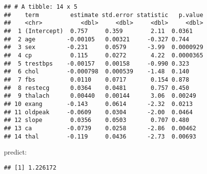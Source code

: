 \documentclass[
]{article}
\newenvironment{Shaded}{\begin{snugshade}}{\end{snugshade}}
\newcommand{\AttributeTok}[1]{\textcolor[rgb]{0.77,0.63,0.00}{#1}}
\newcommand{\DecValTok}[1]{\textcolor[rgb]{0.00,0.00,0.81}{#1}}
\newcommand{\FloatTok}[1]{\textcolor[rgb]{0.00,0.00,0.81}{#1}}
\newcommand{\FunctionTok}[1]{\textcolor[rgb]{0.00,0.00,0.00}{#1}}
\newcommand{\NormalTok}[1]{#1}
\newcommand{\OtherTok}[1]{\textcolor[rgb]{0.56,0.35,0.01}{#1}}
\newcommand{\SpecialCharTok}[1]{\textcolor[rgb]{0.00,0.00,0.00}{#1}}
\newcommand{\StringTok}[1]{\textcolor[rgb]{0.31,0.60,0.02}{#1}}
\begin{document}
\begin{verbatim}
## # A tibble: 14 x 5
##    term         estimate std.error statistic   p.value
##    <chr>           <dbl>     <dbl>     <dbl>     <dbl>
##  1 (Intercept)  0.757     0.359        2.11  0.0361   
##  2 age         -0.00105   0.00321     -0.327 0.744    
##  3 sex         -0.231     0.0579      -3.99  0.0000929
##  4 cp           0.115     0.0272       4.22  0.0000365
##  5 trestbps    -0.00157   0.00158     -0.990 0.323    
##  6 chol        -0.000798  0.000539    -1.48  0.140    
##  7 fbs          0.0110    0.0717       0.154 0.878    
##  8 restecg      0.0364    0.0481       0.757 0.450    
##  9 thalach      0.00440   0.00144      3.06  0.00249  
## 10 exang       -0.143     0.0614      -2.32  0.0213   
## 11 oldpeak     -0.0609    0.0304      -2.00  0.0464   
## 12 slope        0.0356    0.0503       0.707 0.480    
## 13 ca          -0.0739    0.0258      -2.86  0.00462  
## 14 thal        -0.119     0.0436      -2.73  0.00693
\end{verbatim}

predict:

\begin{Shaded}
\end{Shaded}

\begin{verbatim}
## [1] 1.226172
\end{verbatim}

\begin{Shaded}
\end{Shaded}
\end{document}
